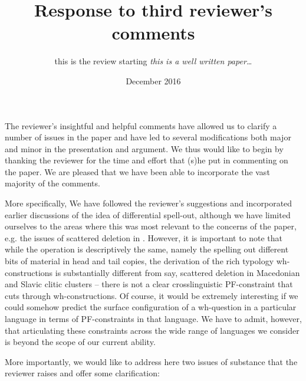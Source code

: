 \documentclass[11pt]{article}
\begin{document}
\title{Response to third reviewer's comments}
\author{this is the review starting \textit{this is a well written paper\ldots}}
\date{December 2016}

\maketitle


The reviewer's insightful and helpful comments have allowed us to clarify a number of issues in the paper and have led to several modifications both major and minor in the presentation and argument. We thus would like to begin by thanking the reviewer for the time and effort that (s)he put in commenting on the paper. We are pleased that we have been able to incorporate the vast majority of the comments.

More specifically, We have followed the reviewer's suggestions and incorporated earlier discussions of the idea of differential spell-out, although we have limited ourselves to the areas where this was most relevant to the concerns of the paper, e.g. the issues of scattered deletion in \cite{boskovic-nunes:2007}. However, it is important to note that while the operation is descriptively the same, namely the spelling out different bits of material in head and tail copies, the derivation of the rich typology wh-constructions is substantially different from say, scattered deletion in Macedonian and Slavic clitic clusters -- there is not a clear crosslinguistic PF-constraint that cuts through wh-constructions. Of course, it would be extremely interesting if we could somehow predict the surface configuration of a wh-question in a particular language in terms of PF-constraints in that language. We have to admit, however, that articulating these constraints across the wide range of languages we consider is beyond the scope of our current ability.

More importantly, we would like to address here two issues of substance that the reviewer raises and offer some clarification:
\end{document}
